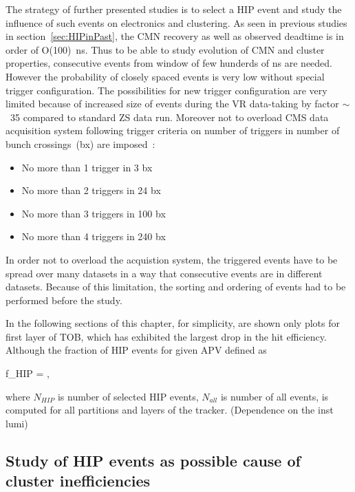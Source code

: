 The strategy of further presented studies is to select a HIP event and study the influence of such events on electronics and clustering. As seen in previous studies in section~\ref{sec:HIPinPast}, the CMN recovery as well as observed deadtime is in order of O(100)~ns. Thus to be able to study evolution of CMN and cluster properties, consecutive events from window of few hunderds of ns are needed. However the probability of closely spaced events is very low without special trigger configuration. The possibilities for new trigger configuration are very limited because of increased size of events during the VR data-taking by factor $\sim$~35 compared to standard ZS data run. Moreover not to overload CMS data acquisition system following trigger criteria on number of triggers in number of bunch crossings~(bx) are  imposed~\cite{website:VRtrigger}:

\begin{itemize}
\item{No more than 1 trigger in 3 bx}
\item{No more than 2 triggers in 24 bx}
\item{No more than 3 triggers in 100 bx}
\item{No more than 4 triggers in 240 bx}
\end{itemize}

In order not to overload the acquistion system, the triggered events have to be spread over many datasets in a way that consecutive events are in different datasets. Because of this limitation, the sorting and ordering of events had to be performed before the study.

In the following sections of this chapter, for simplicity, are shown only plots for first layer of TOB, which has exhibited the largest drop in the hit efficiency. Although the fraction of HIP events for given APV defined as


{
f_{HIP} = ,
}

where $N_{HIP}$ is number of selected HIP events, $N_{all}$ is number of all events, is computed for all partitions and layers of the tracker. (Dependence on the inst lumi)


\subsection{Study of HIP events as possible cause of cluster inefficiencies}

